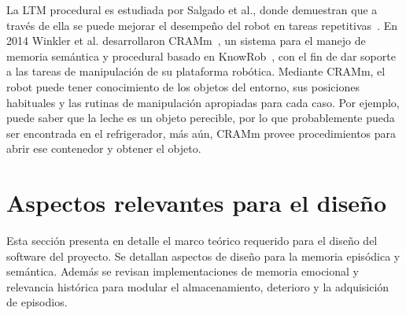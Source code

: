 La LTM procedural es estudiada por Salgado et al., donde demuestran que a través de ella se puede mejorar el desempeño del robot en tareas repetitivas~\cite{Salgado2012}. En 2014 Winkler et al. desarrollaron CRAMm~\cite{Winkler2014}, un sistema para el manejo de memoria semántica y procedural basado en KnowRob~\cite{Tenorth2013}, con el fin de dar soporte a las tareas de manipulación de su plataforma robótica. Mediante CRAMm, el robot puede tener conocimiento de los objetos del entorno, sus posiciones habituales y las rutinas de manipulación apropiadas para cada caso. Por ejemplo, puede saber que la leche es un objeto perecible, por lo que probablemente pueda ser encontrada en el refrigerador, más aún, CRAMm provee procedimientos para abrir ese contenedor y obtener el objeto.









\section{Aspectos relevantes para el diseño}

Esta sección presenta en detalle el marco teórico requerido para el diseño del software del proyecto. Se detallan aspectos de diseño para la memoria episódica y semántica. Además se revisan implementaciones de memoria emocional y relevancia histórica para modular el almacenamiento, deterioro y la adquisición de episodios.


